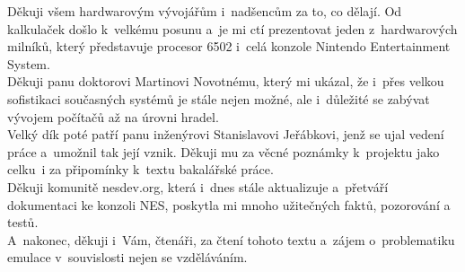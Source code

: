 \documentclass[czech,bachelor,unicode]{ctufit-thesis}
\theoremstyle{plain}
\theoremstyle{definition}
\theoremstyle{remark}
\numberwithin{theorem}{chapter}
\begin{document}
 
\frontmatter\frontmatterinit %


\thispagestyle{empty}\cleardoublepage\maketitle %

\imprintpage %

\tableofcontents %
\listoffigures %
\begingroup
\let\clearpage\relax
\listoftables %
\listoflistings %
\endgroup

\begin{acknowledgmentpage}
	Děkuji všem hardwarovým vývojářům i~nadšencům za to, co dělají. Od kalkulaček došlo k~velkému posunu a~je mi ctí prezentovat jeden z~hardwarových milníků, který představuje procesor 6502 i~celá konzole Nintendo Entertainment System.\\
	
	Děkuji panu doktorovi Martinovi Novotnému, který mi ukázal, že i~přes velkou sofistikaci současných systémů je stále nejen možné, ale i~důležité se zabývat vývojem počítačů až na úrovni hradel.\\
	
	Velký dík poté patří panu inženýrovi Stanislavovi Jeřábkovi, jenž se ujal vedení práce a~umožnil tak její vznik. Děkuji mu za věcné poznámky k~projektu jako celku~i za připomínky k~textu bakalářské práce.\\
	
    Děkuji komunitě nesdev.org, která i~dnes stále aktualizuje a~přetváří dokumentaci ke konzoli NES, poskytla mi mnoho užitečných faktů, pozorování a testů.\\
    
    A~nakonec, děkuji i~Vám, čtenáři, za čtení tohoto textu a~zájem o~problematiku emulace v~souvislosti nejen se vzděláváním.
\end{acknowledgmentpage} 
\end{document}
